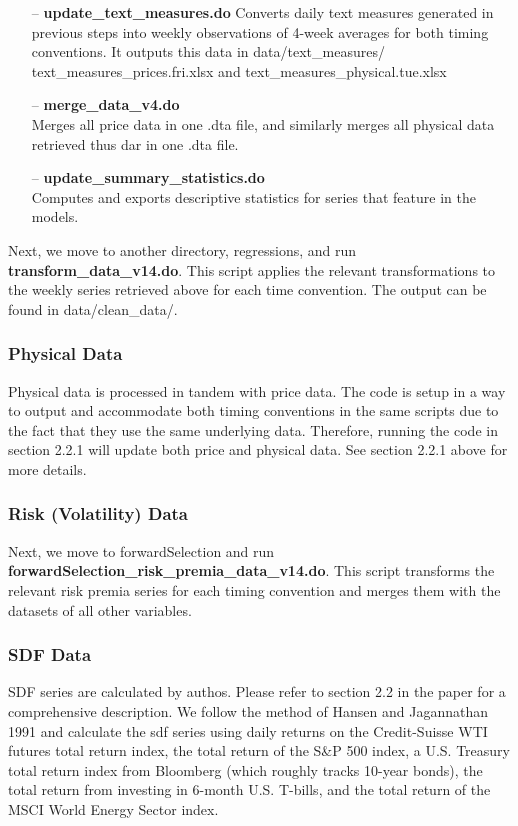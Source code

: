 \documentclass[11pt]{article}
\begin{document}
\begin{enumerate}
	\item[--]
	\textbf{update\_text\_measures.do}
	Converts daily text measures generated in previous steps into weekly observations of 4-week averages for both timing conventions. It outputs this data in
 data/text\_measures/ text\_measures\_prices.fri.xlsx and text\_measures\_physical.tue.xlsx
	
	\item[--]
	\textbf{merge\_data\_v4.do}\\
	Merges all price data in one .dta file, and similarly merges all physical data retrieved thus dar in one .dta file. 
	
	\item[--]
	\textbf{update\_summary\_statistics.do}\\
	Computes and exports descriptive statistics for series that feature in the models. 
\end{enumerate}

Next, we move to another directory, regressions, and run \textbf{transform\_data\_v14.do}. This script applies the relevant transformations to the weekly series retrieved above for each time convention. The output can be found in data/clean\_data/.

\subsubsection{Physical Data}
Physical data is processed in tandem with price data. The code is setup in a way to output and accommodate both timing conventions in the same scripts due to the fact that they use the same underlying data. Therefore, running the code in section 2.2.1 will update both price and physical data. See section 2.2.1 above for more details.

\subsubsection{Risk (Volatility) Data}
Next, we move to forwardSelection and run \textbf{forwardSelection\_risk\_premia\_data\_v14.do}. This script transforms the relevant risk premia series for each timing convention and merges them with the datasets of all other variables.

\subsubsection{SDF Data}
SDF series are calculated by authos. Please refer to section 2.2 in the paper for a comprehensive description. We follow the method of Hansen and Jagannathan 1991 and calculate the sdf series using daily returns on the Credit-Suisse WTI futures total return index, the total return of the S\&P 500 index, a U.S. Treasury total return index from Bloomberg (which roughly tracks 10-year bonds), the total return from investing in 6-month U.S. T-bills, and the total return of the MSCI World Energy Sector index. \\
\end{document}
